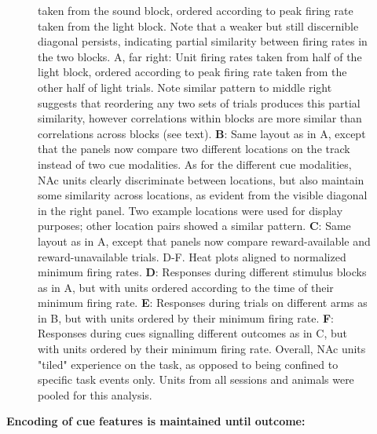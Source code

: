 \documentclass[11pt]{article}
\newcommand{\bsf}[1]{\textbf{#1}}
\begin{document}
{\begin{figure}[h]
{  taken from the sound block, ordered according to peak firing rate taken from
  the light block. Note that a weaker but still discernible diagonal persists,
  indicating partial similarity between firing rates in the two blocks. A, far
  right: Unit firing rates taken from half of the light block, ordered according
  to peak firing rate taken from the other half of light trials. Note similar
  pattern to middle right suggests that reordering any two sets of trials
  produces this partial similarity, however correlations within blocks are more
  similar than correlations across blocks (see text). \bsf{B}: Same layout as in
  A, except that the panels now compare two different locations on the track
  instead of two cue modalities. As for the different cue modalities, NAc units
  clearly discriminate between locations, but also maintain some similarity
  across locations, as evident from the visible diagonal in the right panel. Two
  example locations were used for display purposes; other location pairs showed
  a similar pattern. \bsf{C}: Same layout as in A, except that panels now
  compare reward-available and reward-unavailable trials. D-F. Heat plots
  aligned to normalized minimum firing rates. \bsf{D}: Responses during
  different stimulus blocks as in A, but with units ordered according to the
  time of their minimum firing rate. \bsf{E}: Responses during trials on
  different arms as in B, but with units ordered by their minimum firing
  rate. \bsf{F}: Responses during cues signalling different outcomes as in C,
  but with units ordered by their minimum firing rate. Overall, NAc units
  "tiled" experience on the task, as opposed to being confined to specific task
  events only. Units from all sessions and animals were pooled for this
  analysis.}
\label{fig:tiling}
\end{figure}

{\bf Encoding of cue features is maintained until outcome:}

}
\end{document}
